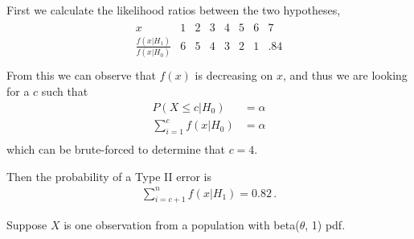 \documentclass[12pt,letterpaper]{exam}
\begin{document}
\begin{questions}
	\begin{solution}
		First we calculate the likelihood ratios between the two hypotheses,
		\begin{align*}
			\begin{array}{cccccccc}
				x & 1 & 2 & 3 & 4 & 5 & 6 & 7 \\ \hline 
				\frac{f(x|H_1)}{f(x|H_0)} & 6 & 5 & 4 & 3 & 2 & 1 & .84 \\
			\end{array}
		\end{align*}
		From this we can observe that \(f(x)\) is decreasing on \(x\), 
		and thus we are looking for a \(c\) such that
		\begin{align*}
			P(X\leq c|H_0) &= \alpha \\
			\sum_{i=1}^{c} f(x|H_0) &= \alpha \\
		\end{align*}
		which can be brute-forced to determine that \(c=4\).
		
		Then the probability of a Type II error is
		\begin{align*}
			\sum_{i=c+1}^{n} f(x|H_1) = 0.82 \,.
		\end{align*}
	
	\end{solution}
	
	\setcounter{question}{23-1}
	
	\question 
	Suppose $X$ is one observation from a population with beta($\theta$, 1) pdf.
	
	\begin{solution}
		\begin{parts}

\end{parts}
\end{solution}
\end{questions}
\end{document}
